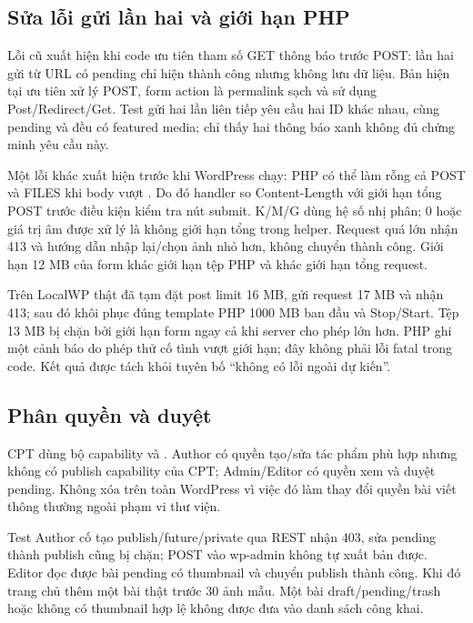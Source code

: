 \subsection{Sửa lỗi gửi lần hai và giới hạn PHP}
Lỗi cũ xuất hiện khi code ưu tiên tham số GET thông báo trước POST: lần hai gửi từ URL có pending chỉ hiện thành công nhưng không lưu dữ liệu. Bản hiện tại ưu tiên xử lý POST, form action là permalink sạch và sử dụng Post/Redirect/Get. Test gửi hai lần liên tiếp yêu cầu hai ID khác nhau, cùng pending và đều có featured media; chỉ thấy hai thông báo xanh không đủ chứng minh yêu cầu này.

Một lỗi khác xuất hiện trước khi WordPress chạy: PHP có thể làm rỗng cả POST và FILES khi body vượt . Do đó handler so Content-Length với giới hạn tổng POST trước điều kiện kiểm tra nút submit. K/M/G dùng hệ số nhị phân; 0 hoặc giá trị âm được xử lý là không giới hạn tổng trong helper. Request quá lớn nhận 413 và hướng dẫn nhập lại/chọn ảnh nhỏ hơn, không chuyển thành công. Giới hạn 12 MB của form khác giới hạn tệp PHP và khác giới hạn tổng request.\cite{phpLimits}

Trên LocalWP thật đã tạm đặt post limit 16 MB, gửi request 17 MB và nhận 413; sau đó khôi phục đúng template PHP 1000 MB ban đầu và Stop/Start. Tệp 13 MB bị chặn bởi giới hạn form ngay cả khi server cho phép lớn hơn. PHP ghi một cảnh báo do phép thử cố tình vượt giới hạn; đây không phải lỗi fatal trong code. Kết quả được tách khỏi tuyên bố ``không có lỗi ngoài dự kiến''.

\subsection{Phân quyền và duyệt}
CPT dùng bộ capability  và . Author có quyền tạo/sửa tác phẩm phù hợp nhưng không có publish capability của CPT; Admin/Editor có quyền xem và duyệt pending. Không xóa  trên toàn WordPress vì việc đó làm thay đổi quyền bài viết thông thường ngoài phạm vi thư viện.\cite{wordpressCpt}

Test Author cố tạo publish/future/private qua REST nhận 403, sửa pending thành publish cũng bị chặn; POST vào wp-admin không tự xuất bản được. Editor đọc được bài pending có thumbnail và chuyển publish thành công. Khi đó trang chủ thêm một bài thật trước 30 ảnh mẫu. Một bài draft/pending/trash hoặc không có thumbnail hợp lệ không được đưa vào danh sách công khai.

